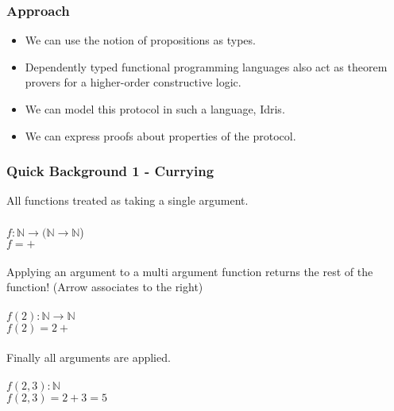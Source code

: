 \documentclass{beamer}
\begin{document}
\begin{frame}[fragile]
  \frametitle{Approach}
  \begin{itemize}
    \item We can use the notion of propositions as types.
    \item Dependently typed functional programming languages
            also act as theorem provers for a higher-order
                  constructive logic.
    \item We can model this protocol in such a language, Idris.
    \item We can express proofs about properties of the protocol.
  \end{itemize}
\end{frame}

\begin{frame}[fragile]
  \frametitle{Quick Background 1 - Currying}
  All functions treated as taking a single argument. \\ \\
  $f : \mathbb{N} \rightarrow (\mathbb{N} \rightarrow \mathbb{N}$) 
    \\
  $f = + $ \\ \\
  Applying an argument to a multi argument function returns the 
    rest of the function! (Arrow associates to the right)\\ \\
  $f(2) : \mathbb{N} \rightarrow \mathbb{N}$ \\
  $f(2) = 2 + $ \\ \\
  Finally all arguments are applied. \\ \\
  $f(2, 3) : \mathbb{N}$ \\
  $f(2, 3) = 2 + 3 = 5 $
\end{frame}
\end{document}
